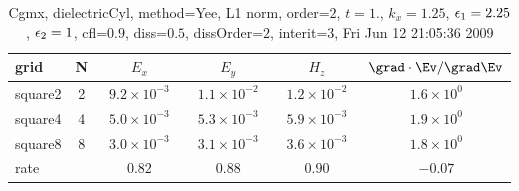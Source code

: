 \begin{table}[hbt]\tableFont %
\begin{center}
\begin{tabular}{|l|c|c|c|c|c|} \hline 
grid  & N &  $E_x$ &  $E_y$ & $H_z$ & $\grad\cdot\Ev/\grad\Ev$\\ \hline 
             square2 &     2 & ~$9.2\times10^{ -3}$~ & ~$1.1\times10^{ -2}$~ & ~$1.2\times10^{ -2}$~ & ~$1.6\times10^{  0}$~  \\ \hline
             square4 &     4 & ~$5.0\times10^{ -3}$~ & ~$5.3\times10^{ -3}$~ & ~$5.9\times10^{ -3}$~ & ~$1.9\times10^{  0}$~  \\ \hline
             square8 &     8 & ~$3.0\times10^{ -3}$~ & ~$3.1\times10^{ -3}$~ & ~$3.6\times10^{ -3}$~ & ~$1.8\times10^{  0}$~  \\ \hline
    rate             &       &       $0.82$          &       $0.88$          &       $0.90$          &       $-0.07$           \\ \hline
\end{tabular}
\caption{Cgmx, dielectricCyl, method=Yee, L1 norm, order=$2$, $t=1.$, $k_x=1.25$, $\epsilon_1=2.25$, $\epsilon_2=1$, cfl=$0.9$, diss=$0.5$, dissOrder=$2$, interit=$3$, Fri Jun 12 21:05:36 2009}\label{table:dielectricCylYeeOrder2L1}
\end{center}
\end{table}
